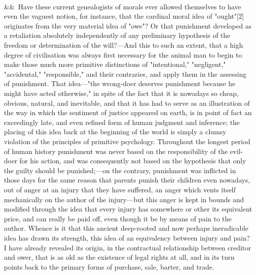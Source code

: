 \documentclass[12pt]{article}
\newcommand{\para}[1][]{\par\noindent\ifx&#1&\else\textsuperscript{\footnotesize #1}~\fi}
\begin{document}
\para Have these current genealogists of morals ever allowed themselves to have even the vaguest notion, for instance, that the cardinal moral idea of "ought"[2] originates from the very material idea of "owe"? Or that punishment developed as a retaliation absolutely independently of any preliminary hypothesis of the freedom or determination of the will?---And this to such an extent, that a high degree of civilisation was always first necessary for the animal man to begin to make those much more primitive distinctions of "intentional," "negligent," "accidental," "responsible," and their contraries, and apply them in the assessing of punishment. That idea---"the wrong-doer deserves punishment because he might have acted otherwise," in spite of the fact that it is nowadays so cheap, obvious, natural, and inevitable, and that it has had to serve as an illustration of the way in which the sentiment of justice appeared on earth, is in point of fact an exceedingly late, and even refined form of human judgment and inference; the placing of this idea back at the beginning of the world is simply a clumsy violation of the principles of primitive psychology. Throughout the longest period of human history punishment was never based on the responsibility of the evil-doer for his action, and was consequently not based on the hypothesis that only the guilty should be punished;---on the contrary, punishment was inflicted in those days for the same reason that parents punish their children even nowadays, out of anger at an injury that they have suffered, an anger which vents itself mechanically on the author of the injury---but this anger is kept in bounds and modified through the idea that every injury has somewhere or other its equivalent price, and can really be paid off, even though it be by means of pain to the author. Whence is it that this ancient deep-rooted and now perhaps ineradicable idea has drawn its strength, this idea of an equivalency between injury and pain? I have already revealed its origin, in the contractual relationship between creditor and ower, that is as old as the existence of legal rights at all, and in its turn points back to the primary forms of purchase, sale, barter, and trade.
\end{document}
